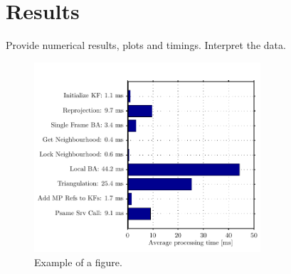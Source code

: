 \chapter{Results}\label{sec:results}

Provide numerical results, plots and timings. Interpret the data.

\begin{figure}[h]
   \centering
   \includegraphics[width=0.75\textwidth]{img/processing_time.pdf}
   \caption{Example of a figure.}
   \label{img:timing}
\end{figure}